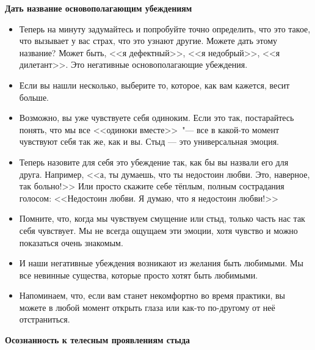 \vspace{3ex}

{\large \textbf{Дать название основополагающим убеждениям}}

\vspace{1ex}

\begin{itemize}
	\item Теперь на минуту задумайтесь и попробуйте точно определить, что это такое, что вызывает у вас страх, что это узнают другие. Можете дать этому название? Может быть, <<я дефектный>>, <<я недобрый>>, <<я дилетант>>. Это негативные основополагающие убеждения.
	
	\item Если вы нашли несколько, выберите то, которое, как вам кажется, весит больше.
	
	\item Возможно, вы уже чувствуете себя одиноким. Если это так, постарайтесь понять, что мы все <<одиноки вместе>>~"--- все в какой-то момент чувствуют себя так же, как и вы. Стыд — это универсальная эмоция.
	
	\item Теперь назовите для себя это убеждение так, как бы вы назвали его для друга. Например, <<а, ты думаешь, что ты недостоин любви. Это, наверное, так больно!>> Или просто скажите себе тёплым, полным сострадания голосом: <<Недостоин любви. Я думаю, что я недостоин любви!>>
	
	\item Помните, что, когда мы чувствуем смущение или стыд, только часть нас так себя чувствует. Мы не всегда ощущаем эти эмоции, хотя чувство и можно показаться очень знакомым.
	
	\item И наши негативные убеждения возникают из желания быть любимыми. Мы все невинные существа, которые просто хотят быть любимыми.
	
	\item Напоминаем, что, если вам станет некомфортно во время практики, вы можете в любой момент открыть глаза или как-то по-другому от неё отстраниться.
\end{itemize}

\vspace{3ex}

{\large \textbf{Осознанность к телесным проявлениям стыда}}

\vspace{1ex}

